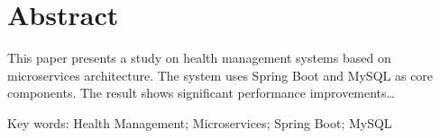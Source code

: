 \section*{Abstract}

This paper presents a study on health management systems based on microservices architecture. The system uses Spring Boot and MySQL as core components. The result shows significant performance improvements…

Key words: Health Management; Microservices; Spring Boot; MySQL
